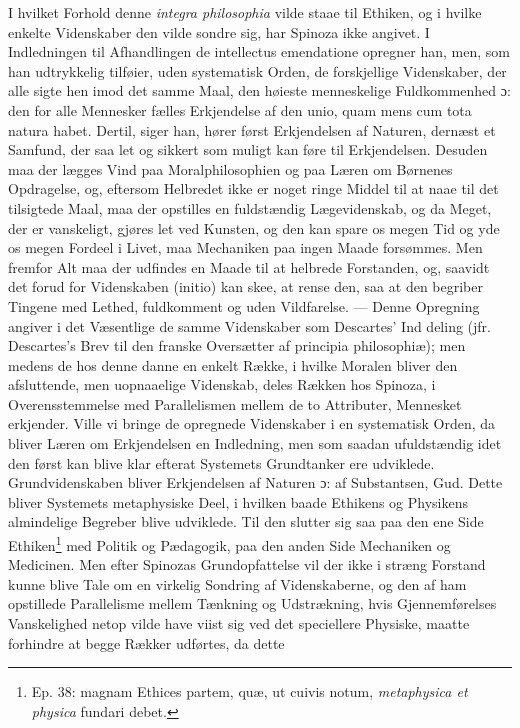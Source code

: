 \documentclass[12pt,a4paper]{book}
\newcommand{\opage}[1]{\marginnote{\footnotesize\textit{[#1]}}}
\begin{document}
I hvilket Forhold denne \emph{integra philosophia} vilde staae til
Ethiken, og i hvilke enkelte Videnskaber den vilde sondre sig, har Spinoza
ikke angivet. I Indledningen til Afhandlingen de intellectus emendatione
opregner han, men, som han udtrykkelig tilføier, uden systematisk Orden,
de forskjellige Videnskaber, der alle sigte hen imod det samme Maal, den
høieste menneskelige Fuldkommenhed ɔ: den for alle Mennesker fælles
Erkjendelse af den unio, quam mens cum tota natura habet. Dertil, siger
han, hører først Erkjendelsen af Naturen, dernæst et Samfund, der saa let
og sikkert som muligt kan føre til Erkjendelsen. Desuden maa der lægges
Vind paa Moralphilosophien og paa Læren om Børnenes Opdragelse, og,
eftersom Helbredet ikke er noget ringe Middel til at naae til det
tilsigtede Maal, maa der opstilles en fuldstændig Lægevidenskab, og da
Meget, der er vanskeligt, gjøres let ved Kunsten, og den kan spare os
megen Tid og yde os megen Fordeel i Livet, maa Mechaniken paa ingen Maade
forsømmes. Men fremfor Alt maa der udfindes en Maade til at helbrede
Forstanden, og, saavidt det forud for Videnskaben (initio) kan skee, at
rense den, saa at den begriber Tingene med Lethed, fuldkomment og uden
Vildfarelse. --- Denne Opregning angiver i det Væsentlige de samme
Videnskaber som Descartes' Ind\-%
\opage{42}\setcounter{footnote}{0}%
deling (jfr. Descartes's Brev til den franske Oversætter af principia
philosophiæ); men medens de hos denne danne en enkelt Række, i hvilke
Moralen bliver den afsluttende, men uopnaaelige Videnskab, deles Rækken
hos Spinoza, i Overensstemmelse med Parallelismen mellem de to Attributer,
Mennesket erkjender. Ville vi bringe de opregnede Videnskaber i en
systematisk Orden, da bliver Læren om Erkjendelsen en Indledning, men som
saadan ufuldstændig idet den først kan blive klar efterat Systemets
Grundtanker ere udviklede. Grundvidenskaben bliver Erkjendelsen af Naturen
ɔ: af Substantsen, Gud. Dette bliver Systemets metaphysiske Deel, i
hvilken baade Ethikens og Physikens almindelige Begreber blive udviklede.
Til den slutter sig saa paa den ene Side Ethiken\footnote{Ep. 38: magnam
Ethices partem, quæ, ut cuivis notum, \emph{metaphysica et physica}
fundari debet.} med Politik og Pædagogik, paa den anden Side Mechaniken og
Medicinen. Men efter Spinozas Grundopfattelse vil der ikke i stræng
Forstand kunne blive Tale om en virkelig Sondring af Videnskaberne, og den
af ham opstillede Parallelisme mellem Tænkning og Udstrækning, hvis
Gjennemførelses Vanskelighed netop vilde have viist sig ved det
speciellere Physiske, maatte forhindre at begge Rækker udførtes, da dette
\end{document}
